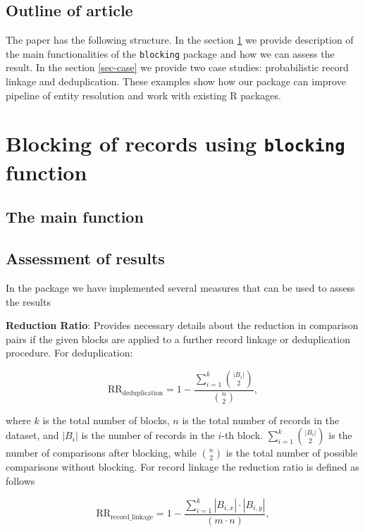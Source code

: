 \subsection{Outline of article}\label{outline-of-article}

The paper has the following structure. In the section \ref{sec-blocks} we provide description of the main functionalities of the \texttt{blocking} package and how we can assess the result. In the section \ref{sec-case} we provide two case studies: probabilistic record linkage and deduplication. These examples show how our package can improve pipeline of entity resolution and work with existing R packages.

\section{\texorpdfstring{Blocking of records using \texttt{blocking} function}{Blocking of records using blocking function}}\label{sec-blocks}

\subsection{The main function}\label{the-main-function}

\subsection{Assessment of results}\label{assessment-of-results}

In the package we have implemented several measures that can be used to
assess the results

\textbf{Reduction Ratio}: Provides necessary details about the reduction in
comparison pairs if the given blocks are applied to a further record
linkage or deduplication procedure. For deduplication:

\[
\text{RR}_{\text{deduplication}} = 1 - \frac{\sum\limits_{i=1}^{k} \binom{|B_i|}{2}}{\binom{n}{2}},
\]

where \(k\) is the total number of blocks, \(n\) is the total number of
records in the dataset, and \(|B_i|\) is the number of records in the
\(i\)-th block. \(\sum\limits_{i=1}^{k} \binom{|B_i|}{2}\) is the number of
comparisons after blocking, while \(\binom{n}{2}\) is the total number of
possible comparisons without blocking. For record linkage the reduction
ratio is defined as follows

\[
\text{RR}_{\text{record\_linkage}} = 1 - \frac{\sum\limits_{i=1}^{k} |B_{i,x}| \cdot |B_{i,y}|} {(m \cdot n)},
\]

